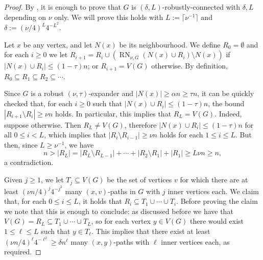 \documentclass[a4paper, 11pt,reqno]{amsart}
\theoremstyle{plain}
\newtheorem{proposition}[theorem]{Proposition}
\theoremstyle{definition}
\numberwithin{equation}{section}
\begin{document}

\begin{proof}
	By , it is enough to prove that $G$ is
        $(\delta, L)$-robustly-connected with $\delta, L$ depending on
        $\nu$ only.  We will prove this holds with $L := \lceil
        \nu^{-1} \rceil$ and $\delta := (\nu / 4)^L 4^{-L^2}$.
	
	Let $x$ be any vertex, and let $N(x)$ be its neighbourhood.
        We define $R_0 = \emptyset$ and for each $i \geq 0$ we let
        $R_{i+1} = R_i \cup ( \operatorname{RN}_{\nu, G}(N(x) \cup
        R_i) \setminus N(x))$ if $|N(x) \cup R_i| \leq (1 - \tau)n$;
        or $R_{i+1} = V(G)$ otherwise.  By definition, $R_0 \subseteq
        R_1 \subseteq R_2 \subseteq \dotsb$.
	
	Since $G$ is a robust $(\nu, \tau)$-expander and $|N(x)| \geq
        \alpha n \geq \tau n$, it can be quickly checked that, for
        each $i \geq 0$ such that $|N(x) \cup R_i| \leq (1 - \tau)n$,
        the bound ${|R_{i+1} \setminus R_i| \geq \nu n}$ holds.  In
        particular, this implies that $R_L = V(G)$.  Indeed, suppose
        otherwise.  Then $R_L \neq V(G)$, therefore $|N(x) \cup R_{i}|
        \leq (1 - \tau)n$ for all $0 \leq i < L$, which implies that
        $|R_i \setminus R_{i-1}| \geq \nu n$ holds for each $1 \leq i
        \leq L$.  But then, since $L \geq \nu^{-1}$, we have
	\[ n > |R_L| = |R_L \setminus R_{L-1}| + \dotsb + |R_2 \setminus R_1| + |R_1| \geq L \nu n \geq n, \]
	a contradiction.
	
	Given $j \geq 1$, we let $T_j \subseteq V(G)$ be the set of
        vertices $v$ for which there are at least $(\nu n/4)^j
        4^{-j^2}$ many $(x,v)$-paths in $G$ with $j$ inner vertices
        each.  We claim that, for each $0 \leq i \leq L$, it holds
        that $R_i \subseteq T_1 \cup \dotsb \cup T_i$.  Before proving
        the claim we note that this is enough to conclude: as
        discussed before we have that $V(G) = R_L \subseteq T_1 \cup
        \dotsb \cup T_L$, so for each vertex $y \in V(G)$ there would
        exist ${1 \leq \ell \leq L}$ such that $y \in T_\ell$.  This
        implies that there exist at least $(\nu n/4)^\ell 4^{-\ell^2}
        \geq \delta n^\ell$ many $(x,y)$-paths with $\ell$ inner
        vertices each, as required.
	

\end{proof}
\end{document}
